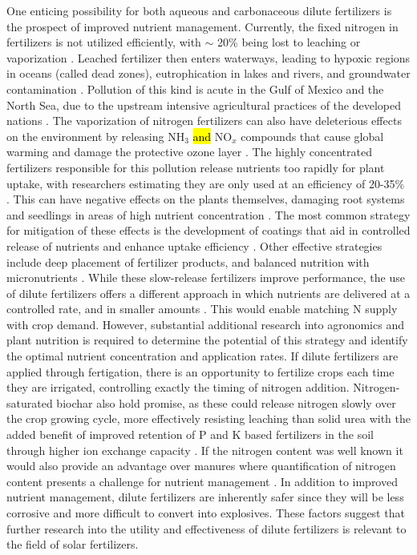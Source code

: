 One enticing possibility for both aqueous and carbonaceous dilute fertilizers is the prospect of improved nutrient management. Currently, the fixed nitrogen in fertilizers is not utilized efficiently, with $\sim$ 20\% being lost to leaching or vaporization \cite{Smil_1999_2, Naz_2016}. Leached fertilizer then enters waterways, leading to hypoxic regions in oceans (called dead zones), eutrophication in lakes and rivers, and groundwater contamination \cite{Diaz2008,Conley_2009,Shindo_2006}.  Pollution of this kind is acute in the Gulf of Mexico and the North Sea, due to the upstream intensive agricultural practices of the developed nations \cite{Diaz2008,Conley_2009}. The vaporization of nitrogen fertilizers can also have deleterious effects on the environment by releasing NH$_3$ \hl{and} NO$_x$ compounds that cause global warming and damage the protective ozone layer \cite{Ravishankara_2009}. The highly concentrated fertilizers responsible for this pollution release nutrients too rapidly for plant uptake, with researchers estimating they are only used at an efficiency of 20-35\% \cite{Naz_2016}. This can have negative effects on the plants themselves, damaging root systems and seedlings in areas of high nutrient concentration \cite{Morgan2009}. The most common strategy for mitigation of these effects is the development of coatings that aid in controlled release of nutrients and enhance uptake efficiency \cite{Naz_2016}. Other effective strategies include deep placement of fertilizer products, and balanced nutrition with micronutrients \cite{angle2017role}. While these slow-release fertilizers improve performance, the use of dilute fertilizers offers a different approach in which nutrients are delivered at a controlled rate, and in smaller amounts \cite{kadyampakeni_2015, Flink_1995}. This would enable matching N supply with crop demand. However, substantial additional research into agronomics and plant nutrition is required to determine the potential of this strategy and identify the optimal nutrient concentration and application rates. If dilute fertilizers are applied through fertigation, there is an opportunity to fertilize crops each time they are irrigated, controlling exactly the timing of nitrogen addition. Nitrogen-saturated biochar also hold promise, as these could release nitrogen slowly over the crop growing cycle, more effectively resisting leaching than solid urea with the added benefit of improved retention of P and K based fertilizers in the soil through higher ion exchange capacity \cite{Glaser2002}. If the nitrogen content was well known it would also provide an advantage over manures where quantification of nitrogen content presents a challenge for nutrient management \cite{Ye}. In addition to improved nutrient management, dilute fertilizers are inherently safer since they will be less corrosive and more difficult to convert into explosives. These factors suggest that further research into the utility and effectiveness of dilute fertilizers is relevant to the field of solar fertilizers.

